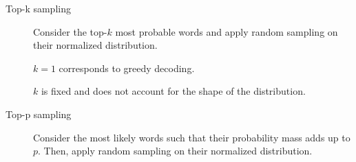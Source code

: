 \begin{description}
\begin{description}
            \item[Top-k sampling]
                Consider the top-$k$ most probable words and apply random sampling on their normalized distribution.

                \begin{remark}
                    $k=1$ corresponds to greedy decoding.
                \end{remark}

                \begin{remark}
                    $k$ is fixed and does not account for the shape of the distribution.
                \end{remark}

            \item[Top-p sampling]
                Consider the most likely words such that their probability mass adds up to $p$. Then, apply random sampling on their normalized distribution.
        \end{description}
\end{description}